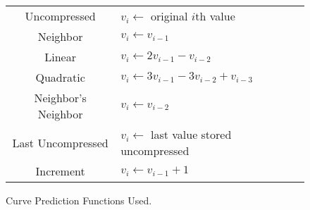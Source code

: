 \begin{figure}
	\centering
	\begin{tabular}{cl}
		Uncompressed & \(v_i \gets \) original \(i\)th value \\
		Neighbor & \(v_i \gets v_{i-1}\) \\
		Linear & \(v_i \gets 2v_{i-1} - v_{i-2}\) \\
		Quadratic & \(v_i \gets 3v_{i-1} - 3v_{i-2} + v_{i-3}\) \\
		Neighbor's Neighbor & \(v_i \gets v_{i-2}\) \\
		Last Uncompressed & \(v_i \gets\) last value stored uncompressed \\
		Increment & \(v_i \gets v_{i-1}+1\)
	\end{tabular}

	\caption{Curve Prediction Functions Used.}
	\label{fig:comp-sz-modes}
	
\end{figure}